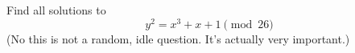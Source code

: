   Find all solutions to
  \[
    y^2 = x^3 + x + 1 \pmod{26}
  \]
  (No this is not a random, idle question. It's actually very important.)
